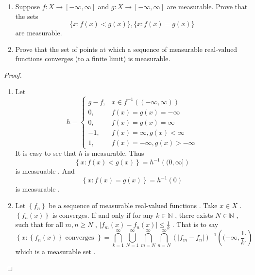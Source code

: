 \documentclass[../main.tex]{subfiles}
\begin{document}
\begin{problem}{}{}
\begin{enumerate}
    \item[(a)] Suppose $f: X \to [-\infty, \infty]$ and $g: X \to [-\infty, \infty]$ are measurable. Prove that the sets
    \[ \{x: f(x) < g(x)\}, \{x: f(x) = g(x)\} \]
    are measurable.
    \item[(b)] Prove that the set of points at which a sequence of measurable real-valued functions converges (to a finite limit) is measurable.
\end{enumerate}
\end{problem}
\begin{proof}
    \begin{enumerate}
        \item Let  \[
        h= \begin{cases} g-f , & x \in f^{-1} \left( (-\infty,\infty) \right)  \\ 
         0,& f\left( x \right)= g\left( x \right)= -\infty \\ 
          0,& f\left( x \right)= g\left( x \right)= \infty\\ 
           -1, & f\left( x \right)= \infty , g\left( x \right)< \infty  \\ 
            1 , &f\left( x \right)= -\infty ,g\left( x \right)> -\infty      \end{cases} 
        \]It is easy to see that \(  h  \) is measurable.  Thus  \[
       \left\{ x: f\left( x \right)< g\left( x \right)   \right\} =   h^{-1} \left((0,\infty] \right)
        \]  is measruable .  And \[
        \left\{ x: f\left( x \right)= g\left( x \right)   \right\}=  h^{-1} \left( 0 \right) 
        \] is measurable . 
        \item Let \(  \left\{ f_{n} \right\}  \) be a sequence of measurable real-valued functions . Take \(  x \in X  \) . \(  \left\{ f_{n}\left( x \right)  \right\}   \) is converges. If and only if for any \(  k \in \mathbb{N}   \) , there   exists  \(  N \in \mathbb{N}   \) , such that for all \(  m,n \ge N  \) , \(  \left| f_{m}\left( x \right)-f_{n}\left( x \right)   \right|\le \frac{1 }{k }    \) .  That is to say \[
       \left\{ x: \left\{ f_{n}\left( x \right)  \right\} \text{ converges } \right\}=  \bigcap_{k= 1}^{\infty}\bigcup _{N= 1}^{\infty} \bigcap_{m = N}^{\infty} \bigcap_{n = N}^{\infty} \left( \left| f_{m}-f_{n} \right|  \right)^{-1} \left( (-\infty,\frac{1 }{k } ] \right)     
        \] which is a measurable set .   
    \end{enumerate}
    
\end{proof}
\end{document}
